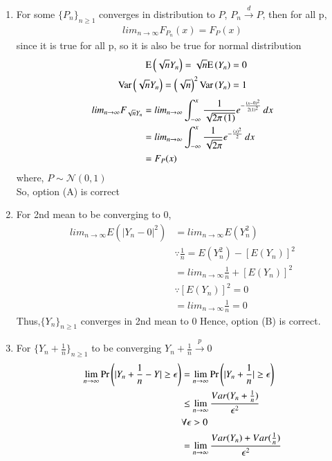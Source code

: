 \documentclass[journal,12pt,Twocolumn]{IEEEtran}
\theoremstyle{remark}
\begin{document}
\begin{enumerate}[label=(\Alph*)]
\item 
For some $\{P_n\}_{n \geq 1}$  converges in distribution to $P$, $P_n \xrightarrow{d} P$, then for all p,
\begin{align}
lim_{n \to \infty} F_{P_n}(x) = F_{P}(x) 
\end{align}
since it is true for all p, so it is also be true for normal distribution
\begin{align}
\text{E}\left(\sqrt{n}Y_n\right)=\sqrt{n}\text{E}\left(Y_n\right)=0 \\
\text{Var}\left(\sqrt{n}Y_n\right)=\left(\sqrt{n}\right)^2\text{Var}\left(Y_n\right) = 1
\end{align}
\begin{align}
lim_{n \to \infty} F_{\sqrt{n}Y_n} 
&= lim_{n \to \infty} \int_{-\infty}^{x} \frac{1}{\sqrt{2\pi\left(1\right)}}e^{-\frac{\left(x-0\right)^2}{2\left(1\right)^2}} \,dx \\
&= lim_{n \to \infty} \int_{-\infty}^{x} \frac{1}{\sqrt{2\pi}}e^{-\frac{\left(x\right)^2}{2}} \,dx \\
&=F_P(x)
\end{align}
where, $P \sim \mathcal{N}(0,1)$ \\
So, option (A) is correct\
\item For 2nd mean to be converging to 0,
\begin{align}
lim_{n \to \infty} E(|Y_n-0|^2)&=lim_{n \to \infty} E(Y_n^2) \\
&\because \frac{1}{n} = E(Y_n^2) - [E(Y_n)]^2 \\
&=lim_{n \to \infty} \frac{1}{n} + [E(Y_n)]^2 \\
&\because [E(Y_n)]^2 = 0 \\
&=lim_{n \to \infty} \frac{1}{n} = 0 
\end{align}
Thus,$\{Y_n\}_{n \geq 1}$ converges in 2nd mean to 0
Hence, option (B) is correct.
\item For $\{Y_n+\frac{1}{n}\}_{n \geq 1}$ to be converging $Y_n +\frac{1}{n} \xrightarrow{p} 0$ \\
\begin{align}
\lim_{n \to \infty} \pr{|Y_n +\frac{1}{n}-Y| \geq  \epsilon} 
&=\lim_{n \to \infty} \pr{|Y_n +\frac{1}{n}| \geq  \epsilon} \\ 
&\leq \lim_{n \to \infty} \frac{Var(Y_n +\frac{1}{n})}{\epsilon^2} \\
& \forall \epsilon > 0 \\
&=\lim_{n \to \infty} \frac{Var(Y_n)+Var(\frac{1}{n})}{\epsilon^2} \\

\end{align}
\end{enumerate}
\end{document}
